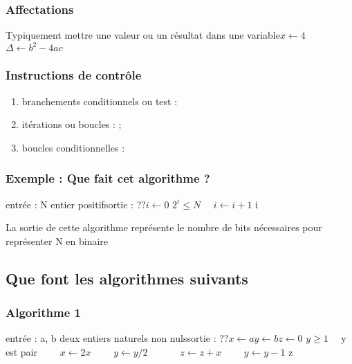 \documentclass[letterpaper,10pt,english]{sphinxmanual}
\begin{document}
\subsubsection{Affectations}
\label{\detokenize{src/OCI_HS1_Algorithmes:affectations}}
Typiquement mettre une valeur ou un résultat dans une variable\(x \leftarrow 4\)\( \Delta \leftarrow b^2 - 4ac\)


\subsubsection{Instructions de contrôle}
\label{\detokenize{src/OCI_HS1_Algorithmes:instructions-de-controle}}\begin{enumerate}
%
\item {} 
branchements conditionnels ou test : 

\item {} 
itérations ou boucles :  ; 

\item {} 
boucles conditionnelles : 

\end{enumerate}


\subsubsection{Exemple : Que fait cet algorithme ?}
\label{\detokenize{src/OCI_HS1_Algorithmes:exemple-que-fait-cet-algorithme}}
entrée : N entier positifsortie : ??\(i \leftarrow 0 \) \(2^i \leq N \)\(\quad\) \( i \leftarrow i + 1 \) i

La sortie de cette algorithme représente le nombre de bits nécessaires pour représenter N en binaire


\subsection{Que font les algorithmes suivants}
\label{\detokenize{src/OCI_HS1_Algorithmes:que-font-les-algorithmes-suivants}}

\subsubsection{Algorithme 1}
\label{\detokenize{src/OCI_HS1_Algorithmes:algorithme-1}}
entrée : a, b deux entiers naturels non nulssortie : ??\(x \leftarrow a\)\(y \leftarrow b \)\(z \leftarrow 0 \) \(y \geq 1 \)\(\quad\)  y est pair\(\qquad\) \(x \leftarrow 2x \)\(\qquad\) \(y \leftarrow y / 2\)\(\quad\)\(\qquad\) \(z \leftarrow z + x \)\(\qquad\) \(y \leftarrow y-1 \) z
\end{document}

